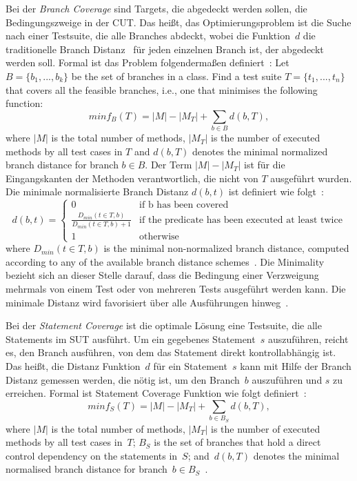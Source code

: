 \documentclass{article}
\begin{document}
Bei der \textit{Branch Coverage} sind Targets, die abgedeckt werden sollen, die Bedingungszweige in der \ac{CUT}. Das heißt, das Optimierungsproblem ist die Suche nach einer Testsuite, die alle Branches abdeckt, wobei die Funktion~$d$ die traditionelle Branch Distanz~\cite{Pacheco_2007} für jeden einzelnen Branch ist, der abgedeckt werden soll. Formal ist das Problem folgendermaßen definiert~\cite{Fraser2014}: Let $B = \{b_1, ..., b_k\}$ be the set of branches in a class. Find a test suite $T = \{t_1, ..., t_n\}$ that covers all the feasible branches, i.e., one that minimises the following function:
\begin{equation}
minf_B(T) = \left|M\right| - \left|M_T\right| + \sum_{b \in B}{d(b, T)},
\end{equation}
where $\left|M\right|$ is the total number of methods, $\left|M_T\right|$ is the number of executed methods by all test cases in $T$ and $d(b, T)$ denotes the minimal normalized branch distance for branch $b \in B$. Der Term $\left|M\right| - \left|M_T\right|$ ist für die Eingangskanten der Methoden verantwortlich, die nicht von $T$ ausgeführt wurden. Die minimale normalisierte Branch Distanz $d(b, t)$ ist definiert wie folgt~\cite{Fraser_2013}:
\begin{equation}
d(b, t) = \left\{ \begin{array}{cl}
0 & \textrm{if b has been covered} \\
\frac{D_{min}(t \in T, b)}{D_{min}(t \in T, b) + 1} & \textrm{if the predicate has been executed at least twice} \\
1 & \textrm{otherwise}
\end{array} \right.
\end{equation}
where $D_{min}(t \in T, b)$ is the minimal non-normalized branch distance, computed according to any of the available branch distance schemes~\cite{McMinn_2004}. Die Minimality bezieht sich an dieser Stelle darauf, dass die Bedingung einer Verzweigung mehrmals von einem Test oder von mehreren Tests ausgeführt werden kann. Die minimale Distanz wird favorisiert über alle Ausführungen hinweg~\cite{Panichella2018}.

Bei der \textit{Statement Coverage} ist die optimale Lösung eine Testsuite, die alle Statements im \ac{SUT} ausführt. Um ein gegebenes Statement~$s$ auszuführen, reicht es, den Branch ausführen, von dem das Statement direkt kontrollabhängig ist. Das heißt, die Distanz Funktion~$d$ für ein Statement~$s$ kann mit Hilfe der Branch Distanz gemessen werden, die nötig ist, um den Branch~$b$ auszuführen und $s$ zu erreichen. Formal ist Statement Coverage Funktion wie folgt definiert~\cite{Fraser_2013}:
\begin{equation}
minf_S(T) = \left|M\right| - \left|M_T\right| + \sum_{b \in B_S}{d(b, T)},
\end{equation}
where $\left|M\right|$ is the total number of methods, $\left|M_T\right|$ is the number of executed methods by all test cases in~$T$; $B_S$ is the set of branches that hold a direct control dependency on the statements in~$S$; and~$d(b, T)$ denotes the minimal normalised branch distance for branch~$b \in B_S$~\cite{Panichella2018}.
\end{document}
